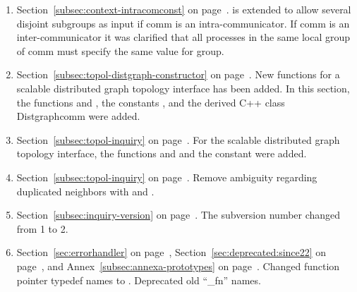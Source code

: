 \begin{enumerate}
\item
Section~\ref{subsec:context-intracomconst} on page~\pageref{subsec:context-intracomconst}. %
\newline
{} is extended to allow several disjoint subgroups as input if comm is an intra-communicator. If comm is an inter-communicator it was clarified that all processes in the same local group of comm must specify the same value for group.

\item
Section~\ref{subsec:topol-distgraph-constructor} on page~\pageref{subsec:topol-distgraph-constructor}. %
\newline
New functions for a scalable distributed graph topology interface has been added. In this section, the functions  and , the constants , and the derived C++ class Distgraphcomm were added.

\item
{\raggedright
Section~\ref{subsec:topol-inquiry} on page~\pageref{subsec:topol-inquiry}. %
\newline
For the scalable distributed graph topology interface, the 
functions  
and  
and the constant  were added.

}
\item
Section~\ref{subsec:topol-inquiry} on page~\pageref{subsec:topol-inquiry}. %
\newline
Remove ambiguity regarding duplicated neighbors with  and . 

\item
Section~\ref{subsec:inquiry-version} on page~\pageref{subsec:inquiry-version}. %
\newline
The subversion number changed from 1 to 2.

% 
% 
% 
\item
Section~\ref{sec:errorhandler} on page~\pageref{sec:errorhandler}, %
Section~\ref{sec:deprecated:since22} on page~\pageref{sec:deprecated:since22}, and %
Annex~\ref{subsec:annexa-prototypes} on page~\pageref{subsec:annexa-prototypes}. %
\newline
Changed function pointer typedef names  to . Deprecated old ``\_fn'' names. 



\end{enumerate}
